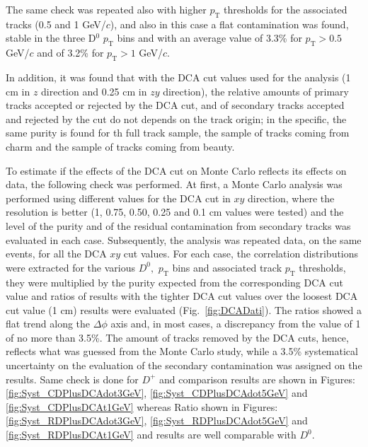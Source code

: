 The same check was repeated also with higher $p_\text{T}$ thresholds for the associated tracks (0.5 and 1 GeV/$c$), and also in this case a flat contamination was found, stable in the three D$^0$ $p_\text{T}$ bins and with an average value of 3.3\% for $p_\text{T} > 0.5$ GeV/$c$ and of 3.2\% for $p_\text{T} > 1$ GeV/$c$.

In addition, it was found that with the DCA cut values used for the analysis (1 cm in $z$ direction and 0.25 cm in $zy$ direction), the relative amounts of primary tracks accepted or rejected by the DCA cut, and of secondary tracks accepted and rejected by the cut do not depends on the track origin; in the specific, the same purity is found for th full track sample, the sample of tracks coming from charm and the sample of tracks coming from beauty.

To estimate if the effects of the DCA cut on Monte Carlo reflects its effects on data, the following check was performed.
At first, a Monte Carlo analysis was performed using different values for the DCA cut in $xy$ direction, where the resolution is better (1, 0.75, 0.50, 0.25 and 0.1 cm values were tested) and the level of the purity and of the residual contamination from secondary tracks was evaluated in each case.
Subsequently, the analysis was repeated data, on the same events, for all the DCA $xy$ cut values. For each case, the correlation distributions were extracted for the various $D^0,$ $p_\text{T}$ bins and associated track $p_\text{T}$ thresholds, they were multiplied by the purity expected from the corresponding DCA cut value and ratios of results with the tighter DCA cut values over the loosest DCA cut value (1 cm) results were evaluated (Fig.~\ref{fig:DCADati}). The ratios showed a flat trend along the $\Delta\phi$ axis and, in most cases, a discrepancy from the value of 1 of no more than 3.5\%. The amount of tracks removed by the DCA cuts, hence, reflects what was guessed from the Monte Carlo study, while a 3.5\% systematical uncertainty on the evaluation of the secondary contamination was assigned on the results. Same check is done for $D^+$  and comparison results are shown in Figures: \ref{fig:Syst_CDPlusDCAdot3GeV}, \ref{fig:Syst_CDPlusDCAdot5GeV} and \ref{fig:Syst_CDPlusDCAt1GeV}  whereas Ratio shown in Figures: \ref{fig:Syst_RDPlusDCAdot3GeV}, \ref{fig:Syst_RDPlusDCAdot5GeV} and \ref{fig:Syst_RDPlusDCAt1GeV} and results are well comparable with $D^0$.

